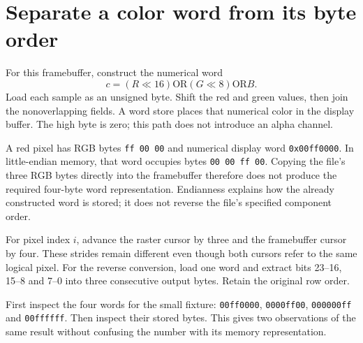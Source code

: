 \section{Separate a color word from its byte order}
For this framebuffer, construct the numerical word
\[
  c=(R\ll16)\mathbin{\mathrm{OR}}(G\ll8)\mathbin{\mathrm{OR}}B.
\]
Load each sample as an unsigned byte. Shift the red and green values, then join the
nonoverlapping fields. A word store places that numerical color in the display buffer.
The high byte is zero; this path does not introduce an alpha channel.

A red pixel has RGB bytes \texttt{ff 00 00} and numerical display word
\texttt{0x00ff0000}. In little-endian memory, that word occupies bytes
\texttt{00 00 ff 00}. Copying the file's three RGB bytes directly into the framebuffer
therefore does not produce the required four-byte word representation. Endianness
explains how the already constructed word is stored; it does not reverse the file's
specified component order.

For pixel index \(i\), advance the raster cursor by three and the framebuffer cursor
by four. These strides remain different even though both cursors refer to the same
logical pixel. For the reverse conversion, load one word and extract bits 23--16,
15--8 and 7--0 into three consecutive output bytes. Retain the original row order.

First inspect the four words for the small fixture: \texttt{00ff0000},
\texttt{0000ff00}, \texttt{000000ff} and \texttt{00ffffff}. Then inspect their stored
bytes. This gives two observations of the same result without confusing the number
with its memory representation.
